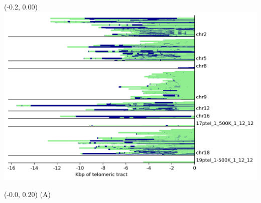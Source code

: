 \documentclass{article}
\begin{document}
\begin{textblock}{13}(-0.2,  0.00) \includegraphics{shortread-support/Figure-support-SXA.png}   \end{textblock}
\begin{textblock}{13}(-0.0,  0.20) \LARGE{(A)} \end{textblock}
\end{document}
